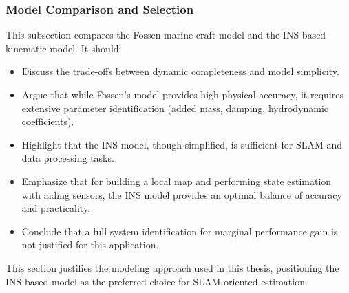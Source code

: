 \subsubsection{Model Comparison and Selection}
This subsection compares the Fossen marine craft model and the INS-based kinematic model. It should:
\begin{itemize}
    \item Discuss the trade-offs between dynamic completeness and model simplicity.
    \item Argue that while Fossen’s model provides high physical accuracy, it requires extensive parameter identification (added mass, damping, hydrodynamic coefficients).
    \item Highlight that the INS model, though simplified, is sufficient for SLAM and data processing tasks.
    \item Emphasize that for building a local map and performing state estimation with aiding sensors, the INS model provides an optimal balance of accuracy and practicality.
    \item Conclude that a full system identification for marginal performance gain is not justified for this application.
\end{itemize}
This section justifies the modeling approach used in this thesis, positioning the INS-based model as the preferred choice for SLAM-oriented estimation.

